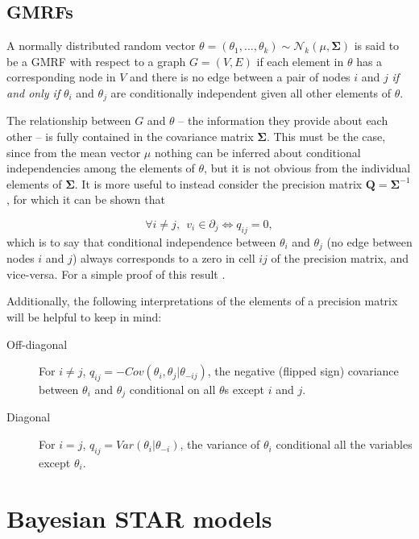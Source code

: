 \subsection{GMRFs}
A normally distributed random vector $\theta = (\theta_1, \dots, \theta_k) \sim \mathcal{N}_k (\mu, \boldsymbol{\Sigma})$ is said to be a GMRF with respect to a graph $G = (V,E)$ if each element in $\theta$ has a corresponding node in $V$ and there is no edge between a pair of nodes $i$ and $j$ \emph{if and only if} $\theta_i$ and $\theta_j$ are conditionally independent given all other elements of $\theta$. 


The relationship between $G$ and $\theta$ -- the information they provide about each other -- is fully contained in the covariance matrix $\boldsymbol{\Sigma}$.  This must be the case, since from the mean vector $\mu$ nothing can be inferred about conditional independencies among the elements of $\theta$, but it is not obvious from the individual elements of $\boldsymbol{\Sigma}$. It is more useful to instead consider the precision matrix $\boldsymbol{Q}=\boldsymbol{\Sigma}^{-1}$, for which it can be shown that

{\singlespacing
$$\forall i \neq j, \:\: v_i \in \partial_j \iff q_{ij} = 0,$$
}
%
\noindent which is to say that conditional independence between $\theta_i$ and $\theta_j$ (no edge between nodes $i$ and $j$) always corresponds to a zero in cell $ij$ of the precision matrix, and vice-versa.  For a simple proof of this result . 

Additionally, the following interpretations of the elements of a precision matrix will be helpful to keep in mind:

\begin{description}
\item[Off-diagonal] For $i \neq j$, $q_{ij}  = -Cov(\theta_i, \theta_j | \theta_{-ij}) $, the negative (flipped sign) covariance between $\theta_i$ and $\theta_j$ conditional on all $\theta$s except $i$ and $j$.  
\item[Diagonal] For $i = j$,  $q_{ij} = Var(\theta_i | \theta_{-i})$, the variance of $\theta_i$ conditional all the variables except $\theta_i$.
\end{description}


\section{Bayesian STAR models}


